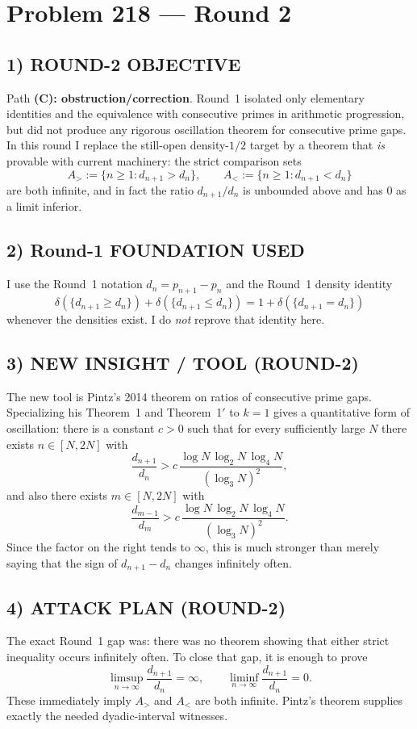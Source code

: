 \section*{Problem 218 --- Round 2}

\subsection*{1) ROUND-2 OBJECTIVE}
Path \textbf{(C): obstruction/correction}.  Round~1 isolated only elementary identities and the equivalence with consecutive primes in arithmetic progression, but did not produce any rigorous oscillation theorem for consecutive prime gaps.  In this round I replace the still-open density-$1/2$ target by a theorem that \emph{is} provable with current machinery: the strict comparison sets
\[
A_{>} := \{n\ge 1 : d_{n+1}>d_n\}, \qquad A_{<} := \{n\ge 1 : d_{n+1}<d_n\}
\]
are both infinite, and in fact the ratio $d_{n+1}/d_n$ is unbounded above and has $0$ as a limit inferior.

\subsection*{2) Round-1 FOUNDATION USED}
I use the Round~1 notation $d_n=p_{n+1}-p_n$ and the Round~1 density identity
\[
\delta(\{d_{n+1}\ge d_n\})+\delta(\{d_{n+1}\le d_n\})=1+\delta(\{d_{n+1}=d_n\})
\]
whenever the densities exist.  I do \emph{not} reprove that identity here.

\subsection*{3) NEW INSIGHT / TOOL (ROUND-2)}
The new tool is Pintz's 2014 theorem on ratios of consecutive prime gaps.  Specializing his Theorem~1 and Theorem~1$'$ to $k=1$ gives a quantitative form of oscillation:
there is a constant $c>0$ such that for every sufficiently large $N$ there exists $n\in[N,2N]$ with
\[
\frac{d_{n+1}}{d_n} > c\,\frac{\log N\,\log_2 N\,\log_4 N}{(\log_3 N)^2},
\]
and also there exists $m\in[N,2N]$ with
\[
\frac{d_{m-1}}{d_m} > c\,\frac{\log N\,\log_2 N\,\log_4 N}{(\log_3 N)^2}.
\]
Since the factor on the right tends to $\infty$, this is much stronger than merely saying that the sign of $d_{n+1}-d_n$ changes infinitely often.

\subsection*{4) ATTACK PLAN (ROUND-2)}
The exact Round~1 gap was: there was no theorem showing that either strict inequality occurs infinitely often.  To close that gap, it is enough to prove
\[
\limsup_{n\to\infty}\frac{d_{n+1}}{d_n}=\infty,
\qquad
\liminf_{n\to\infty}\frac{d_{n+1}}{d_n}=0.
\]
These immediately imply $A_{>}$ and $A_{<}$ are both infinite.  Pintz's theorem supplies exactly the needed dyadic-interval witnesses.

